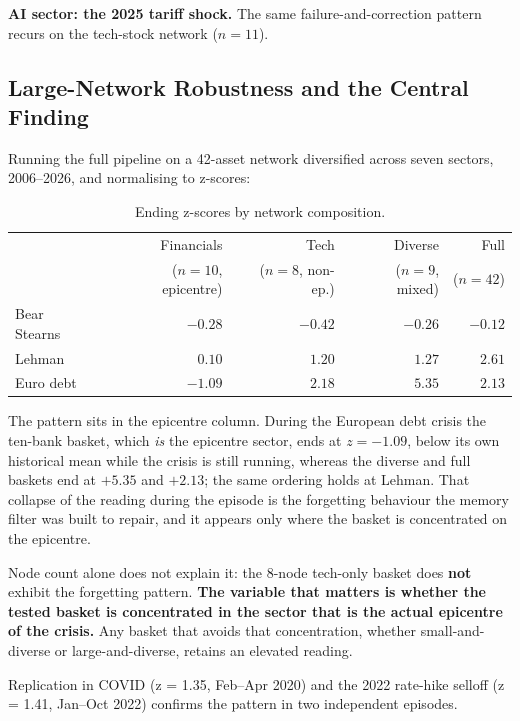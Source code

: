 \documentclass[11pt,a4paper]{article}
\begin{document}
\textbf{AI sector: the 2025 tariff shock.} The same failure-and-correction
pattern recurs on the tech-stock network ($n=11$).


\subsection{Large-Network Robustness and the Central Finding}
\label{sec:large_network}

Running the full pipeline on a 42-asset network diversified across seven
sectors, 2006--2026, and normalising to z-scores:

\begin{table}[ht]
\centering
\caption{Ending z-scores by network composition.}
\label{tab:zscores}
\begin{tabular}{lrrrr}
\toprule
 & Financials & Tech & Diverse & Full \\
 & ($n=10$, epicentre) & ($n=8$, non-ep.) & ($n=9$, mixed) & ($n=42$) \\
\midrule
Bear Stearns & $-0.28$ & $-0.42$ & $-0.26$ & $-0.12$ \\
Lehman       & $0.10$  & $1.20$  & $1.27$  & $\mathbf{2.61}$ \\
Euro debt    & $-1.09$ & $2.18$  & $\mathbf{5.35}$ & $2.13$ \\
\bottomrule
\end{tabular}
\end{table}

The pattern sits in the epicentre column. During the European debt crisis the
ten-bank basket, which \emph{is} the epicentre sector, ends at $z = -1.09$,
below its own historical mean while the crisis is still running, whereas the
diverse and full baskets end at $+5.35$ and $+2.13$; the same ordering holds at
Lehman. That collapse of the reading during the episode is the forgetting
behaviour the memory filter was built to repair, and it appears only where the
basket is concentrated on the epicentre.

Node count alone does not explain it: the 8-node tech-only basket does
\textbf{not} exhibit the forgetting pattern. \textbf{The variable that
matters is whether the tested basket is concentrated in the sector that is
the actual epicentre of the crisis.} Any basket that avoids that
concentration, whether small-and-diverse or large-and-diverse, retains
an elevated reading.

Replication in COVID (z = 1.35, Feb--Apr 2020) and the 2022 rate-hike
selloff (z = 1.41, Jan--Oct 2022) confirms the pattern in two independent
episodes.
\end{document}
